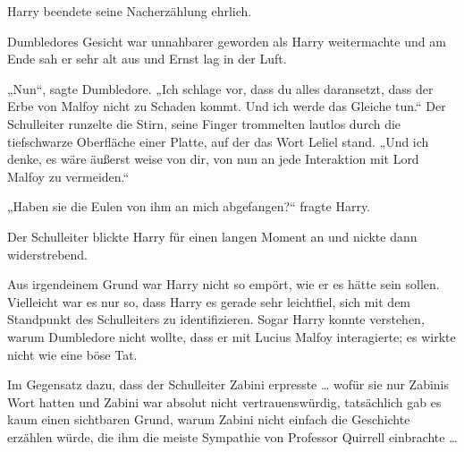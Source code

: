 Harry beendete seine Nacherzählung ehrlich.

Dumbledores Gesicht war unnahbarer geworden als Harry weitermachte und am Ende sah er sehr alt aus und Ernst lag in der Luft.

„Nun“, sagte Dumbledore.
„Ich schlage vor, dass du alles daransetzt, dass der Erbe von Malfoy nicht zu Schaden kommt. Und ich werde das Gleiche tun.“ Der Schulleiter runzelte die Stirn, seine Finger trommelten lautlos durch die tiefschwarze Oberfläche einer Platte, auf der das Wort Leliel stand.
„Und ich denke, es wäre äußerst weise von dir, von nun an jede Interaktion mit Lord Malfoy zu vermeiden.“

„Haben sie die Eulen von ihm an mich abgefangen?“ fragte Harry.

Der Schulleiter blickte Harry für einen langen Moment an und nickte dann widerstrebend.

Aus irgendeinem Grund war Harry nicht so empört, wie er es hätte sein sollen. Vielleicht war es nur so, dass Harry es gerade sehr leichtfiel, sich mit dem Standpunkt des Schulleiters zu identifizieren. Sogar Harry konnte verstehen, warum Dumbledore nicht wollte, dass er mit Lucius Malfoy interagierte; es wirkte nicht wie eine böse Tat.

Im Gegensatz dazu, dass der Schulleiter Zabini erpresste … wofür sie nur Zabinis Wort hatten und Zabini war absolut nicht vertrauenswürdig, tatsächlich gab es kaum einen sichtbaren Grund, warum Zabini nicht einfach die Geschichte erzählen würde, die ihm die meiste Sympathie von Professor Quirrell einbrachte …

